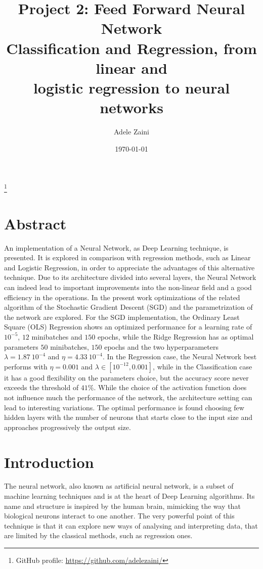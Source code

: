 \documentclass[english,notitlepage,reprint,nofootinbib]{revtex4-1}  %
\begin{document}
\title{\LARGE{Project 2: Feed Forward Neural Network}\\
  \large Classification and Regression, from linear and \\ logistic regression to neural networks}
\author{Adele Zaini}
\thanks{GitHub profile: \href{https://github.com/adelezaini/}{ https://github.com/adelezaini/}}
\date{\today}                             %
\noaffiliation                            %

\maketitle
\section{Abstract}

An implementation of a Neural Network, as Deep Learning technique, is presented. It is explored in comparison with regression methods, such as Linear and Logistic Regression, in order to appreciate the advantages of this alternative technique. Due to its architecture divided into several layers, the Neural Network can indeed lead to important improvements into the non-linear field and a good efficiency in the operations. In the present work optimizations of the related algorithm of the Stochastic Gradient Descent (SGD) and the parametrization of the network are explored. For the SGD implementation, the Ordinary Least Square (OLS) Regression shows an optimized performance for a learning rate of $10^{-5}$, $12$ minibatches and $150$ epochs, while the Ridge Regression has as optimal parameters $50$ minibatches, $150$ epochs and the two hyperparameters $\lambda = 1.87\ 10^{-4}$ and $\eta = 4.33 \ 10^{-4}$. In the Regression case, the Neural Network best performs with $\eta=0.001$ and $\lambda \in [10^{-12},0.001]$, while in the Classification case it has a good flexibility on the parameters choice, but the accuracy score never exceeds the threshold of $41\%$. While the choice of the activation function does not influence much the performance of the network, the architecture setting can lead to interesting variations. The optimal performance is found choosing few hidden layers with the number of neurons that starts close to the input size and approaches progressively the output size. 

\section{Introduction}
The neural network, also known as artificial neural network, is a subset of machine learning techniques and is at the heart of Deep Learning algorithms. Its name and structure is inspired by the human brain, mimicking the way that biological neurons interact to one another. The very powerful point of this technique is that it can explore new ways of analysing and interpreting data, that are limited by the classical methods, such as regression ones. 
\end{document}

